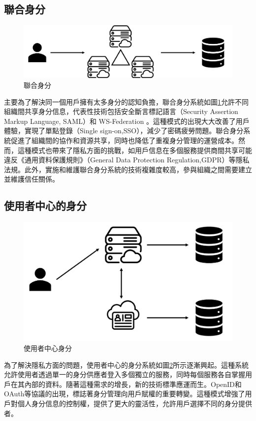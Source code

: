 \subsection{聯合身分}
\begin{figure}
  \centering
  \includegraphics[width=\linewidth,keepaspectratio]{figures/group-identity.png}
  \caption{聯合身分}
  \label{fig:group-identity}
\end{figure}
主要為了解決同一個用戶擁有太多身分的認知負擔，聯合身分系統如圖\ref{fig:group-identity}允許不同組織間共享身分信息，代表性技術包括安全斷言標記語言（Security Assertion Markup Language, SAML）和 WS-Federation \cite{oasis2005security, goodner2009web}。這種模式的出現大大改善了用戶體驗，實現了單點登錄（Single sign-on,SSO），減少了密碼疲勞問題。聯合身分系統促進了組織間的協作和資源共享，同時也降低了重複身分管理的運營成本。然而，這種模式也帶來了隱私方面的挑戰\cite{ahn2007user}，如用戶信息在多個服務提供商間共享可能違反《通用資料保護規則》（General Data Protection Regulation,GDPR）\cite{GDPR2016}等隱私法規。此外，實施和維護聯合身分系統的技術複雜度較高，參與組織之間需要建立並維護信任關係。
\subsection{使用者中心的身分}
\begin{figure}
  \centering
  \includegraphics[width=\linewidth,keepaspectratio]{figures/user-mid-identity.png}
  \caption{使用者中心身分}
  \label{fig:user-mid-identity}
\end{figure}
為了解決隱私方面的問題，使用者中心的身分系統如圖\ref{fig:user-mid-identity}所示逐漸興起。這種系統允許使用者透過單一的身分供應者登入多個獨立的服務，同時每個服務各自掌握用戶在其內部的資料。隨著這種需求的增長，新的技術標準應運而生。OpenID和OAuth等協議的出現\cite{sakimura2014openid, hardt2012oauth}，標誌著身分管理向用戶賦權的重要轉變。這種模式增強了用戶對個人身分信息的控制權，提供了更大的靈活性，允許用戶選擇不同的身分提供者。

